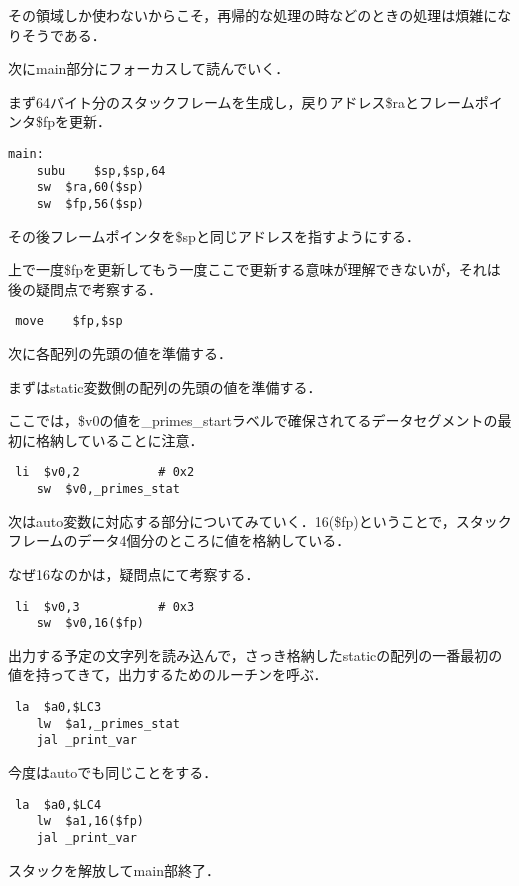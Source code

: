\documentclass[a4j]{jarticle}
\begin{document}
その領域しか使わないからこそ，再帰的な処理の時などのときの処理は煩雑になりそうである．


次にmain部分にフォーカスして読んでいく．

まず64バイト分のスタックフレームを生成し，戻りアドレス\$raとフレームポインタ\$fpを更新．

\begin{verbatim}
main:
    subu    $sp,$sp,64
    sw  $ra,60($sp)
    sw  $fp,56($sp)
\end{verbatim}

その後フレームポインタを\$spと同じアドレスを指すようにする．

上で一度\$fpを更新してもう一度ここで更新する意味が理解できないが，それは後の疑問点で考察する．

\begin{verbatim}
 move    $fp,$sp
\end{verbatim}

次に各配列の先頭の値を準備する．

まずはstatic変数側の配列の先頭の値を準備する．

ここでは，\$v0の値を\_primes\_startラベルで確保されてるデータセグメントの最初に格納していることに注意．


\begin{verbatim}
 li  $v0,2           # 0x2
    sw  $v0,_primes_stat
\end{verbatim}

次はauto変数に対応する部分についてみていく．16(\$fp)ということで，スタックフレームのデータ4個分のところに値を格納している．

なぜ16なのかは，疑問点にて考察する．

\begin{verbatim}
 li  $v0,3           # 0x3
    sw  $v0,16($fp)
\end{verbatim}

出力する予定の文字列を読み込んで，さっき格納したstaticの配列の一番最初の値を持ってきて，出力するためのルーチンを呼ぶ．

\begin{verbatim}
 la  $a0,$LC3
    lw  $a1,_primes_stat
    jal _print_var
\end{verbatim}

今度はautoでも同じことをする．

\begin{verbatim}
 la  $a0,$LC4
    lw  $a1,16($fp)
    jal _print_var
\end{verbatim}

スタックを解放してmain部終了．
\end{document}
